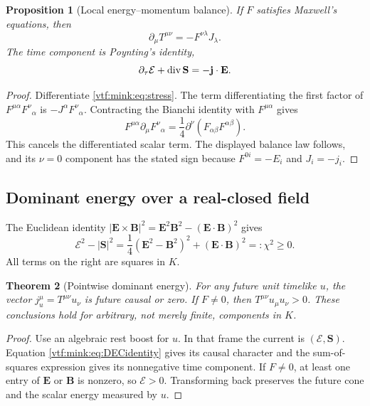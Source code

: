 \documentclass[11pt,letterpaper]{article}
\newtheorem{theorem}{Theorem}[section]
\newtheorem{proposition}[theorem]{Proposition}
\theoremstyle{definition}
\theoremstyle{remark}
\begin{document}
\begin{proposition}[Local energy--momentum balance]\label{vtf:mink:prop:stressdiv}
If $F$ satisfies Maxwell's equations, then
\begin{equation}\label{vtf:mink:eq:stressdiv}
 \partial_\mu T^{\mu\nu}=-F^{\nu\lambda}J_\lambda.
\end{equation}
The time component is Poynting's identity,
\begin{equation}
 \partial_\tau\mathcal E+\operatorname{div}\mathbf S=-\mathbf j\cdot\mathbf E.
\end{equation}
\end{proposition}
\begin{proof}
Differentiate \cref{vtf:mink:eq:stress}. The term differentiating the first factor of $F^{\mu\alpha}F^{\nu}{}_{\alpha}$ is $-J^\alpha F^{\nu}{}_{\alpha}$. Contracting the Bianchi identity with $F^{\mu\alpha}$ gives
\[
 F^{\mu\alpha}\partial_\mu F^{\nu}{}_{\alpha}
 =\frac14\partial^\nu(F_{\alpha\beta}F^{\alpha\beta}).
\]
This cancels the differentiated scalar term. The displayed balance law follows, and its $\nu=0$ component has the stated sign because $F^{0i}=-E_i$ and $J_i=-j_i$.
\end{proof}

\subsection{Dominant energy over a real-closed field}
The Euclidean identity $|\mathbf E\times\mathbf B|^2=\mathbf E^2\mathbf B^2-(\mathbf E\cdot\mathbf B)^2$ gives
\begin{equation}\label{vtf:mink:eq:DECidentity}
 \mathcal E^2-|\mathbf S|^2
 =\frac14(\mathbf E^2-\mathbf B^2)^2+(\mathbf E\cdot\mathbf B)^2
 =:\chi^2\geq0.
\end{equation}
All terms on the right are squares in $K$.

\begin{theorem}[Pointwise dominant energy]\label{vtf:mink:thm:DEC}
For any future unit timelike $u$, the vector
$j_u^\mu=T^{\mu\nu}u_\nu$ is future causal or zero. If $F\ne0$, then $T^{\mu\nu}u_\mu u_\nu>0$. These conclusions hold for arbitrary, not merely finite, components in $K$.
\end{theorem}
\begin{proof}
Use an algebraic rest boost for $u$. In that frame the current is $(\mathcal E,\mathbf S)$. Equation \cref{vtf:mink:eq:DECidentity} gives its causal character and the sum-of-squares expression gives its nonnegative time component. If $F\ne0$, at least one entry of $\mathbf E$ or $\mathbf B$ is nonzero, so $\mathcal E>0$. Transforming back preserves the future cone and the scalar energy measured by $u$.
\end{proof}
\end{document}
